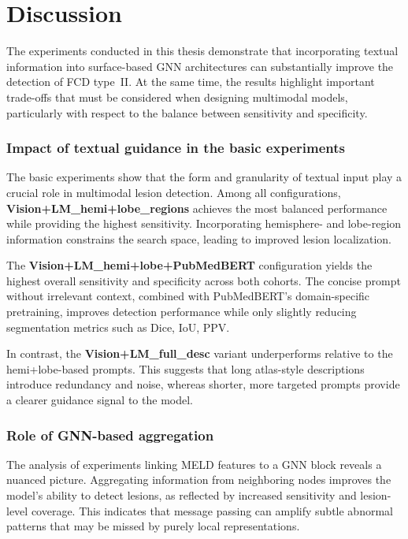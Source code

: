 \documentclass[FCD_GNN.tex]{subfiles}
\begin{document}
\chapter{Discussion}
\label{chapter:Discussion}

The experiments conducted in this thesis demonstrate that incorporating textual
information into surface-based GNN architectures can substantially improve the
detection of FCD type~II.
At the same time, the results highlight important trade-offs that must be
considered when designing multimodal models, particularly with respect to the
balance between sensitivity and specificity.

\subsection*{Impact of textual guidance in the basic experiments}
The basic experiments show that the form and granularity of textual input play a
crucial role in multimodal lesion detection.
Among all configurations, \textbf{Vision+LM\_hemi+lobe\_regions} achieves the most
balanced performance while providing the highest sensitivity.
Incorporating hemisphere- and lobe-region information
constrains the search space, leading to improved lesion localization.

The \textbf{Vision+LM\_hemi+lobe+PubMedBERT} configuration yields the highest
overall sensitivity and specificity across both cohorts.
The concise prompt without irrelevant context, combined with PubMedBERT’s domain-specific pretraining, 
improves detection performance while only slightly reducing segmentation metrics such as Dice, IoU, PPV.

In contrast, the \textbf{Vision+LM\_full\_desc} variant underperforms relative to
the hemi+lobe-based prompts.
This suggests that long atlas-style descriptions introduce redundancy and noise,
whereas shorter, more targeted prompts provide a clearer guidance signal to the model.

\subsection*{Role of GNN-based aggregation}
The analysis of experiments linking MELD features to a GNN block reveals a
nuanced picture.
Aggregating information from neighboring nodes improves the model’s ability to
detect lesions, as reflected by increased sensitivity and lesion-level coverage.
This indicates that message passing can amplify subtle abnormal patterns that may
be missed by purely local representations.
\end{document}

